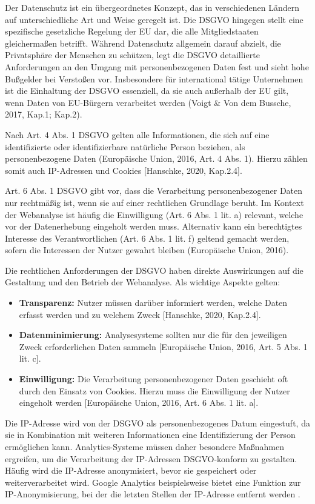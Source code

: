 Der Datenschutz ist ein übergeordnetes Konzept, das in verschiedenen Ländern auf unterschiedliche Art und Weise geregelt ist. Die DSGVO hingegen stellt eine spezifische gesetzliche Regelung der EU dar, die alle Mitgliedstaaten gleichermaßen betrifft. Während Datenschutz allgemein darauf abzielt, die Privatsphäre der Menschen zu schützen, legt die DSGVO detaillierte Anforderungen an den Umgang mit personenbezogenen Daten fest und sieht hohe Bußgelder bei Verstoßen vor. Insbesondere für international tätige Unternehmen ist die Einhaltung der DSGVO essenziell, da sie auch außerhalb der EU gilt, wenn Daten von EU-Bürgern verarbeitet werden (Voigt \& Von dem Bussche, 2017, Kap.1; Kap.2).

Nach Art. 4 Abs. 1 DSGVO gelten alle Informationen, die sich auf eine identifizierte oder identifizierbare natürliche Person beziehen, als personenbezogene Daten (Europäische Union, 2016, Art. 4 Abs. 1). Hierzu zählen somit auch IP-Adressen und Cookies [Hanschke, 2020, Kap.2.4].

Art. 6 Abs. 1 DSGVO gibt vor, dass die Verarbeitung personenbezogener Daten nur rechtmäßig ist, wenn sie auf einer rechtlichen Grundlage beruht. Im Kontext der Webanalyse ist häufig die Einwilligung (Art. 6 Abs. 1 lit. a) relevant, welche vor der Datenerhebung eingeholt werden muss. Alternativ kann ein berechtigtes Interesse des Verantwortlichen (Art. 6 Abs. 1 lit. f) geltend gemacht werden, sofern die Interessen der Nutzer gewahrt bleiben (Europäische Union, 2016).

Die rechtlichen Anforderungen der DSGVO haben direkte Auswirkungen auf die Gestaltung und den Betrieb der Webanalyse. Als wichtige Aspekte gelten: 

\begin{itemize}
    \item \textbf{Transparenz:} Nutzer müssen darüber informiert werden, welche Daten erfasst werden und zu welchem Zweck [Hanschke, 2020, Kap.2.4].
    \item \textbf{Datenminimierung:} Analysesysteme sollten nur die für den jeweiligen Zweck erforderlichen Daten sammeln [Europäische Union, 2016, Art. 5 Abs. 1 lit. c].
    \item \textbf{Einwilligung:} Die Verarbeitung personenbezogener Daten geschieht oft durch den Einsatz von Cookies. Hierzu muss die Einwilligung der Nutzer eingeholt werden [Europäische Union, 2016, Art. 6 Abs. 1 lit. a]. 
\end{itemize}

Die IP-Adresse wird von der DSGVO als personenbezogenes Datum eingestuft, da sie in Kombination mit weiteren Informationen eine Identifizierung der Person ermöglichen kann. Analytics-Systeme müssen daher besondere Maßnahmen ergreifen, um die Verarbeitung der IP-Adressen DSGVO-konform zu gestalten. Häufig wird die IP-Adresse anonymisiert, bevor sie gespeichert oder weiterverarbeitet wird. Google Analytics beispielsweise bietet eine Funktion zur IP-Anonymisierung, bei der die letzten Stellen der IP-Adresse entfernt werden \parencite{eRecht23}. 

